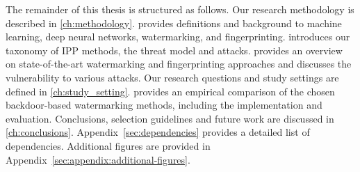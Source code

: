 %
%
%
%
%
%

The remainder of this thesis is structured as follows. 
Our research methodology is described in \cref{ch:methodology}.
 provides definitions and background to machine learning, deep neural networks, watermarking, and fingerprinting.
 introduces our taxonomy of IPP methods, the threat model and attacks.
 provides an overview on state-of-the-art watermarking and fingerprinting approaches and discusses the vulnerability to various attacks.
Our research questions and study settings are defined in \cref{ch:study_setting}.
 provides an empirical comparison of the chosen backdoor-based watermarking methods, including the implementation and evaluation.
Conclusions, selection guidelines and future work are discussed in \cref{ch:conclusions}.
Appendix~\ref{sec:dependencies} provides a detailed list of dependencies.
Additional figures are provided in Appendix~\ref{sec:appendix:additional-figures}.

